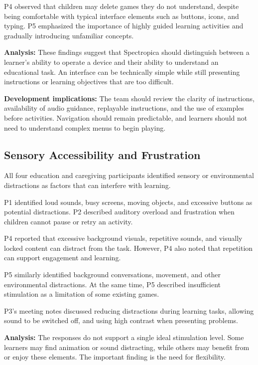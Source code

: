 \documentclass[12pt, titlepage]{article}
\begin{document}
P4 observed that children may delete games they do not understand, despite being comfortable with typical interface elements such as buttons, icons, and typing. P5 emphasized the importance of highly guided learning activities and gradually introducing unfamiliar concepts.

\noindent\textbf{Analysis:} These findings suggest that Spectropica should distinguish between a learner's ability to operate a device and their ability to understand an educational task. An interface can be technically simple while still presenting instructions or learning objectives that are too difficult.

\noindent\textbf{Development implications:} The team should review the clarity of instructions, availability of audio guidance, replayable instructions, and the use of examples before activities. Navigation should remain predictable, and learners should not need to understand complex menus to begin playing.

\subsection{Sensory Accessibility and Frustration}

All four education and caregiving participants identified sensory or environmental distractions as factors that can interfere with learning.

P1 identified loud sounds, busy screens, moving objects, and excessive buttons as potential distractions. P2 described auditory overload and frustration when children cannot pause or retry an activity.

P4 reported that excessive background visuals, repetitive sounds, and visually locked content can distract from the task. However, P4 also noted that repetition can support engagement and learning.

P5 similarly identified background conversations, movement, and other environmental distractions. At the same time, P5 described insufficient stimulation as a limitation of some existing games.

P3's meeting notes discussed reducing distractions during learning tasks, allowing sound to be switched off, and using high contrast when presenting problems.

\noindent\textbf{Analysis:} The responses do not support a single ideal stimulation level. Some learners may find animation or sound distracting, while others may benefit from or enjoy these elements. The important finding is the need for flexibility.
\end{document}

